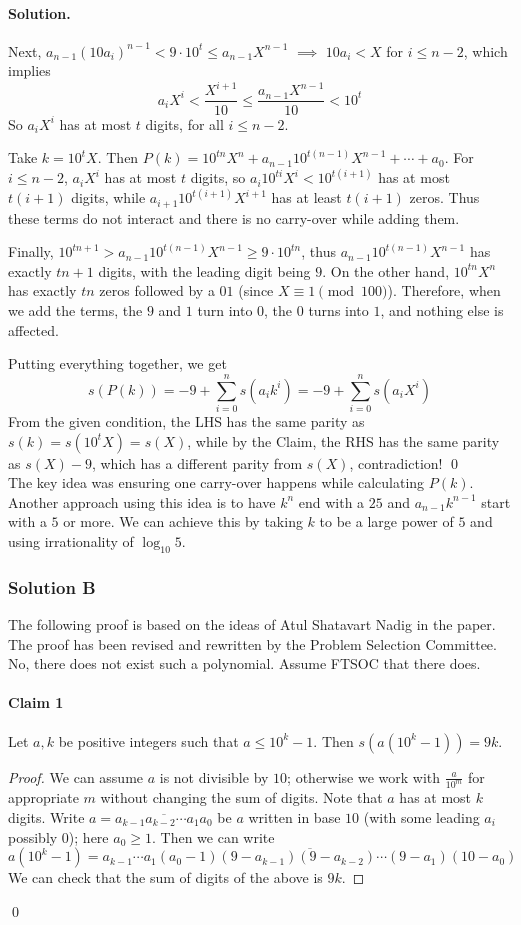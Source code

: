 \documentclass[12pt]{article}
\newenvironment{solution}
{\paragraph{Solution.}}
{\qed\eject}
\newcommand{\hyt}[2]{\hypertarget{#1 Claim #2}{\paragraph{Claim #2}}}
\begin{document}
\begin{solution}
Next, $a_{n-1} (10a_i)^{n-1} < 9 \cdot 10^t \leq a_{n-1}X^{n-1}$ $\implies$ $10 a_i < X$ for $i \leq n-2$, which implies 
$$a_iX^i < \frac{X^{i+1}}{10} \leq \frac{a_{n-1}X^{n-1}}{10}<10^t$$
So $a_iX^i$ has at most $t$ digits, for all $i \leq n-2$.

Take $k=10^tX$. Then $P(k)=10^{tn}X^n+a_{n-1}10^{t(n-1)}X^{n-1}+\cdots +a_0$. For $i \leq n-2$, $a_iX^i$ has at most $t$ digits, so $a_i10^{ti}X^i<10^{t(i+1)}$ has at most $t(i+1)$ digits, while $a_{i+1}10^{t(i+1)}X^{i+1}$ has at least $t(i+1)$ zeros. Thus these terms do not interact and there is no carry-over while adding them.

Finally, $10^{tn+1}>a_{n-1}10^{t(n-1)}X^{n-1} \geq 9 \cdot 10^{tn}$, thus $a_{n-1}10^{t(n-1)}X^{n-1}$ has exactly $tn+1$ digits, with the leading digit being $9$. On the other hand, $10^{tn}X^n$ has exactly $tn$ zeros followed by a $01$ (since $X \equiv 1 \pmod{100}$). Therefore, when we add the terms, the $9$ and $1$ turn into $0$, the $0$ turns into $1$, and nothing else is affected.

Putting everything together, we get
$$s(P(k))=-9+\sum\limits_{i=0}^n s(a_i k^i)=-9+\sum\limits_{i=0}^n s(a_i X^i)$$
From the given condition, the LHS has the same parity as $s(k)=s(10^tX)=s(X)$, while by the Claim, the RHS has the same parity as $s(X)-9$, which has a different parity from $s(X)$, contradiction! \qed
\\

The key idea was ensuring one carry-over happens while calculating $P(k)$. Another approach using this idea is to have $k^n$ end with a $25$ and $a_{n-1}k^{n-1}$ start with a $5$ or more. We can achieve this by taking $k$ to be a large power of $5$ and using irrationality of $\log_{10} 5$.


\subsubsection*{Solution B}

The following proof is based on the ideas of Atul Shatavart Nadig in the paper. The proof has been revised and rewritten by the Problem Selection Committee.\\

No, there does not exist such a polynomial. Assume FTSOC that there does.

\hyt{B}{1} Let $a,k$ be positive integers such that $a \leq 10^k-1$. Then $s(a(10^k-1))=9k$.
\begin{proof}
    We can assume $a$ is not divisible by $10$; otherwise we work with $\frac{a}{10^m}$ for appropriate $m$ without changing the sum of digits. Note that $a$ has at most $k$ digits. Write $a=\overline{a_{k-1}a_{k-2}\cdots a_1a_0}$ be $a$ written in base $10$ (with some leading $a_i$ possibly $0$); here $a_0 \geq 1$. Then we can write
    $$a(10^k-1)=\overline{a_{k-1}\cdots a_1 (a_0-1)(9-a_{k-1})(9-a_{k-2})\cdots (9-a_1)(10-a_0)}$$
    We can check that the sum of digits of the above is $9k$.
\end{proof}


\end{solution}
\end{document}
